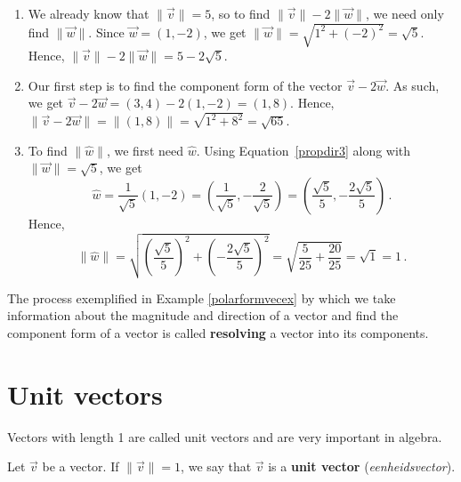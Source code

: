 \begin{example}
\begin{enumerate}
	
	\item  We already know that $\| \vec{v} \| = 5$, so to find  $\| \vec{v} \| -2 \|\vec{w}\|$, we need only find $\| \vec{w} \|$.  Since $\vec{w} = \left(1, -2\right)$, we get $\| \vec{w} \| = \sqrt{1^2+(-2)^2} = \sqrt{5}$.  Hence, $\| \vec{v} \| -2 \|\vec{w}\| = 5 - 2\sqrt{5}$.
	
	\item  Our first step is to find the component form of the vector $\vec{v} - 2\vec{w}$.  As such, we get $\vec{v} - 2 \vec{w} = \left(3,4\right) - 2\left(1,-2\right) = \left(1, 8\right)$.  Hence,  $\| \vec{v} -2\vec{w}\| =  \| \left(1, 8\right)\| = \sqrt{1^2+8^2} = \sqrt{65}$.
	
	
	\item  To find $\| \hat{w} \|$, we first need $\hat{w}$.  Using Equation~\eqref{propdir3} along with $\| \vec{w} \| = \sqrt{5}$,  we get  
	$$\hat{w} = \frac{1}{\sqrt{5}} \left(1, -2\right) = \left( \frac{1}{\sqrt{5}}, -\frac{2}{\sqrt{5}}\right)  = \left( \frac{\sqrt{5}}{5}, -\frac{2\sqrt{5}}{5}\right)\,.$$
	Hence, 
	$$\| \hat{w} \| = \sqrt{\left( \frac{\sqrt{5}}{5}\right)^2 + \left(-\frac{2\sqrt{5}}{5}\right)^2} = \sqrt{\frac{5}{25} + \frac{20}{25}} = \sqrt{1} = 1\,.$$ 
	
	
\end{enumerate}
\fi

\end{example}

The process exemplified in Example \ref{polarformvecex} by which we take information about the magnitude and direction of a vector and find the component form of a vector is called \textbf{resolving} a vector into its components. 


\section{Unit vectors}
\label{sec_eenheidsvect}
 Vectors with length 1 are called unit vectors and are very important in algebra. 



\begin{definition} \label{unitvectordefn}     
Let $\vec{v}$ be a vector. If $\| \vec{v} \| = 1$, we say that $\vec{v}$ is a \textbf{unit vector} (\textit{eenheidsvector}).

\end{definition}

